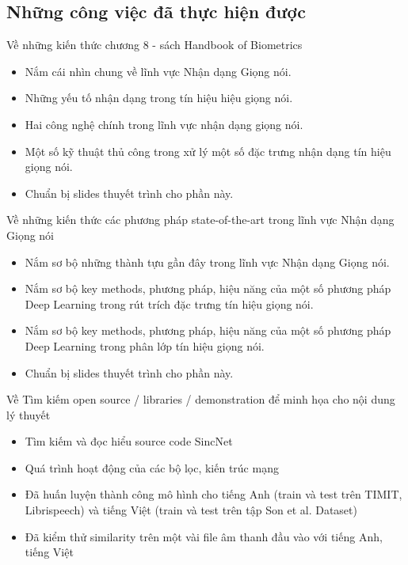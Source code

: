 \documentclass{article}
\begin{document}
	\subsection{Những công việc đã thực hiện được}
	Về những kiến thức chương 8 - sách Handbook of Biometrics
	\begin{itemize}
		\item Nắm cái nhìn chung về lĩnh vực Nhận dạng Giọng nói.
		\item Những yếu tố nhận dạng trong tín hiệu hiệu giọng nói.
		\item Hai công nghệ chính trong lĩnh vực nhận dạng giọng nói.
		\item Một số kỹ thuật thủ công trong xử lý một số đặc trưng nhận dạng tín hiệu giọng nói.
		\item Chuẩn bị slides thuyết trình cho phần này.
	\end{itemize}
	Về những kiến thức các phương pháp state-of-the-art trong lĩnh vực Nhận dạng Giọng nói
	\begin{itemize}
		\item Nắm sơ bộ những thành tựu gần đây trong lĩnh vực Nhận dạng Giọng nói.
		\item Nắm sơ bộ key methods, phương pháp, hiệu năng của một số phương pháp Deep Learning trong rút trích đặc trưng tín hiệu giọng nói.
		\item Nắm sơ bộ key methods, phương pháp, hiệu năng của một số phương pháp Deep Learning trong phân lớp tín hiệu giọng nói.
		\item Chuẩn bị slides thuyết trình cho phần này.
	\end{itemize}
	Về Tìm kiếm open source / libraries / demonstration để minh họa cho nội dung lý thuyết
	\begin{itemize}
		\item Tìm kiếm và đọc hiểu source code SincNet
		\item Quá trình hoạt động của các bộ lọc, kiến trúc mạng 
		\item Đã huấn luyện thành công mô hình cho tiếng Anh (train và test trên TIMIT, Librispeech) và tiếng Việt (train và test trên tập Son et al. Dataset)
		\item Đã kiểm thử similarity trên một vài file âm thanh đầu vào với tiếng Anh, tiếng Việt
	\end{itemize}
\end{document}
